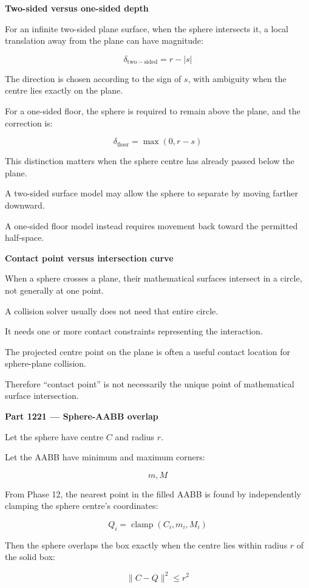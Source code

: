 \textbf{Two-sided versus one-sided depth}

For an infinite two-sided plane surface, when the sphere intersects it, a local translation away from the plane can have magnitude:

\[
\boxed{ \delta_{\mathrm{two-sided}}=r-|s| }
\]

The direction is chosen according to the sign of \(s\), with ambiguity when the centre lies exactly on the plane.

For a one-sided floor, the sphere is required to remain above the plane, and the correction is:

\[
\boxed{ \delta_{\mathrm{floor}}=\max(0,r-s) }
\]

This distinction matters when the sphere centre has already passed below the plane.

A two-sided surface model may allow the sphere to separate by moving farther downward.

A one-sided floor model instead requires movement back toward the permitted half-space.

\textbf{Contact point versus intersection curve}

When a sphere crosses a plane, their mathematical surfaces intersect in a circle, not generally at one point.

A collision solver usually does not need that entire circle.

It needs one or more contact constraints representing the interaction.

The projected centre point on the plane is often a useful contact location for sphere-plane collision.

Therefore ``contact point'' is not necessarily the unique point of mathematical surface intersection.

\textbf{Part 1221 --- Sphere-AABB overlap}

Let the sphere have centre \(C\) and radius \(r\).

Let the AABB have minimum and maximum corners:

\[
m,M
\]

From Phase 12, the nearest point in the filled AABB is found by independently clamping the sphere centre's coordinates:

\[
\boxed{ Q_i=\operatorname{clamp}(C_i,m_i,M_i) }
\]

Then the sphere overlaps the box exactly when the centre lies within radius \(r\) of the solid box:

\[
\boxed{ \|C-Q\|^2\le r^2 }
\]

